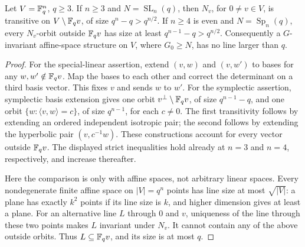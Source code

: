 \begin{lemma}\label{largeorbits}
Let $V=\mathbb F_q^n$, $q\geq3$. If $n\geq3$ and
$N=\operatorname{SL}_n(q)$, then $N_v$, for $0\ne v\in V$, is
transitive on $V\setminus\mathbb F_qv$, of size $q^n-q>q^{n/2}$.
If $n\geq4$ is even and $N=\operatorname{Sp}_n(q)$, every
$N_v$-orbit outside $\mathbb F_qv$ has size at least
$q^{n-1}-q>q^{n/2}$.
Consequently a $G$-invariant affine-space structure on $V$, where
$G_0\geq N$, has no line larger than $q$.
\end{lemma}
\begin{proof}
For the special-linear assertion, extend $(v,w)$ and $(v,w')$ to bases
for any $w,w'\notin\mathbb F_qv$. Map the bases to each other and correct
the determinant on a third basis vector. This fixes $v$ and sends $w$
to $w'$. For the symplectic assertion, symplectic basis extension gives
one orbit $v^\perp\setminus\mathbb F_qv$, of size $q^{n-1}-q$, and one
orbit $\{w:\langle v,w\rangle=c\}$, of size $q^{n-1}$, for each
$c\ne0$. The first transitivity follows by extending an ordered
independent isotropic pair; the second follows by extending the
hyperbolic pair $(v,c^{-1}w)$. These constructions account for every
vector outside $\mathbb F_qv$. The displayed strict inequalities hold already
at $n=3$ and $n=4$, respectively, and increase thereafter.

Here the comparison is only with affine spaces, not arbitrary linear
spaces. Every nondegenerate finite affine space on $|V|=q^n$ points
has line size at most $\sqrt{|V|}$: a plane has exactly $k^2$ points
if its line size is $k$, and higher dimension gives at least a plane.
For an alternative line $L$ through $0$ and $v$, uniqueness of the line
through these two points makes $L$ invariant under $N_v$.
It cannot contain any of the above outside orbits. Thus
$L\subseteq\mathbb F_qv$, and its size is at most $q$.
\end{proof}

